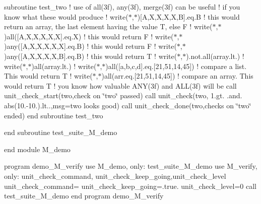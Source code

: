 subroutine test\+\_\+two ! use of all(3f), any(3f), merge(3f) can be useful ! if you know what these would produce ! write($\ast$,$\ast$)\mbox{[}\textquotesingle{}A\textquotesingle{},\textquotesingle{}X\textquotesingle{},\textquotesingle{}X\textquotesingle{},\textquotesingle{}X\textquotesingle{},\textquotesingle{}X\textquotesingle{},\textquotesingle{}B\textquotesingle{}\mbox{]}.eq.\textquotesingle{}B\textquotesingle{} ! this would return an array, the last element having the value T, else F ! write($\ast$,$\ast$)all(\mbox{[}\textquotesingle{}A\textquotesingle{},\textquotesingle{}X\textquotesingle{},\textquotesingle{}X\textquotesingle{},\textquotesingle{}X\textquotesingle{},\textquotesingle{}X\textquotesingle{},\textquotesingle{}X\textquotesingle{}\mbox{]}.eq.\textquotesingle{}X\textquotesingle{}) ! this would return F ! write($\ast$,$\ast$)any(\mbox{[}\textquotesingle{}A\textquotesingle{},\textquotesingle{}X\textquotesingle{},\textquotesingle{}X\textquotesingle{},\textquotesingle{}X\textquotesingle{},\textquotesingle{}X\textquotesingle{},\textquotesingle{}X\textquotesingle{}\mbox{]}.eq.\textquotesingle{}B\textquotesingle{}) ! this would return F ! write($\ast$,$\ast$)any(\mbox{[}\textquotesingle{}A\textquotesingle{},\textquotesingle{}X\textquotesingle{},\textquotesingle{}X\textquotesingle{},\textquotesingle{}X\textquotesingle{},\textquotesingle{}X\textquotesingle{},\textquotesingle{}B\textquotesingle{}\mbox{]}.eq.\textquotesingle{}B\textquotesingle{}) ! this would return T ! write($\ast$,$\ast$).not.\+all(array.\+lt.) ! write($\ast$,$\ast$)all(array.\+lt.) ! write($\ast$,$\ast$)all(\mbox{[}a,b,c,d\mbox{]}.eq.\mbox{[}21,51,14,45\mbox{]}) ! compare a list. This would return T ! write($\ast$,$\ast$)all(arr.\+eq.\mbox{[}21,51,14,45\mbox{]}) ! compare an array. This would return T ! you know how valuable A\+N\+Y(3f) and A\+L\+L(3f) will be call unit\+\_\+check\+\_\+start(\textquotesingle{}two\textquotesingle{},\textquotesingle{}check on \char`\"{}two\char`\"{} passed\textquotesingle{}) call unit\+\_\+check(\textquotesingle{}two\textquotesingle{}, 1.\+gt. .and. abs(10.-\/10.).lt..,msg=\textquotesingle{}two looks good\textquotesingle{}) call unit\+\_\+check\+\_\+done(\textquotesingle{}two\textquotesingle{},\textquotesingle{}checks on \char`\"{}two\char`\"{} ended\textquotesingle{}) end subroutine test\+\_\+two

end subroutine test\+\_\+suite\+\_\+\+M\+\_\+demo

end module M\+\_\+demo

program demo\+\_\+\+M\+\_\+verify use M\+\_\+demo, only\+: test\+\_\+suite\+\_\+\+M\+\_\+demo use M\+\_\+verify, only\+: unit\+\_\+check\+\_\+command, unit\+\_\+check\+\_\+keep\+\_\+going,unit\+\_\+check\+\_\+level unit\+\_\+check\+\_\+command=\textquotesingle{}\textquotesingle{} unit\+\_\+check\+\_\+keep\+\_\+going=.true. unit\+\_\+check\+\_\+level=0 call test\+\_\+suite\+\_\+\+M\+\_\+demo end program demo\+\_\+\+M\+\_\+verify

